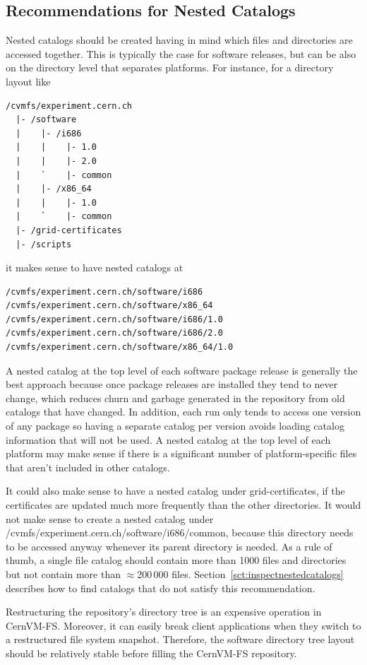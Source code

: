 \subsection{Recommendations for Nested Catalogs}
\label{sct:nestedcatalogrecommendations}
Nested catalogs should be created having in mind which files and directories are accessed together.
This is typically the case for software releases, but can be also on the directory level that separates platforms.
For instance, for a directory layout like
\begin{verbatim}
/cvmfs/experiment.cern.ch
  |- /software
  |    |- /i686
  |    |    |- 1.0
  |    |    |- 2.0
  |    `    |- common
  |    |- /x86_64
  |    |    |- 1.0
  |    `    |- common
  |- /grid-certificates
  |- /scripts
\end{verbatim}
it makes sense to have nested catalogs at
\begin{verbatim}
/cvmfs/experiment.cern.ch/software/i686
/cvmfs/experiment.cern.ch/software/x86_64
/cvmfs/experiment.cern.ch/software/i686/1.0
/cvmfs/experiment.cern.ch/software/i686/2.0
/cvmfs/experiment.cern.ch/software/x86_64/1.0
\end{verbatim}

A nested catalog at the top level of each software package release is generally the best approach because once package releases are installed they tend to never change, which reduces churn and garbage generated in the repository from old catalogs that have changed.
In addition, each run only tends to access one version of any package so having a separate catalog per version avoids loading catalog information that will not be used.
A nested catalog at the top level of each platform may make sense if there is a significant number of platform-specific files that aren't included in other catalogs.

It could also make sense to have a nested catalog under grid-certificates, if the certificates are updated much more frequently than the other directories.
It would not make sense to create a nested catalog under /cvmfs/experiment.cern.ch/software/i686/common, because this directory needs to be accessed anyway whenever its parent directory is needed.
As a rule of thumb, a single file catalog should contain more than 1000 files and directories but not contain more than $\approx$200\,000 files.
Section~\ref{sct:inspectnestedcatalogs} describes how to find catalogs that do not satisfy this recommendation.

Restructuring the repository's directory tree is an expensive operation in CernVM-FS.
Moreover, it can easily break client applications when they switch to a restructured file system snapshot.
Therefore, the software directory tree layout should be relatively stable before filling the CernVM-FS repository.

